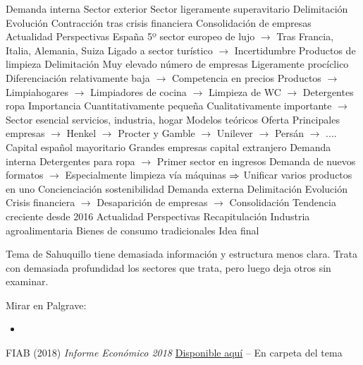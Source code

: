 \documentclass{nuevotema}
\begin{document}
\begin{esquemal}
				\4 Demanda interna
				\4 Sector exterior
				\4[] Sector ligeramente superavitario
				\4 Delimitación
				\4 Evolución
				\4[] Contracción tras crisis financiera
				\4[] Consolidación de empresas
				\4 Actualidad
				\4 Perspectivas
				\4[] España 5º sector europeo de lujo
				\4[] $\to$ Tras Francia, Italia, Alemania, Suiza
				\4[] Ligado a sector turístico
				\4[] $\to$ Incertidumbre
			\3 Productos de limpieza
				\4 Delimitación
				\4[] Muy elevado número de empresas
				\4[] Ligeramente procíclico
				\4[] Diferenciación relativamente baja
				\4[] $\to$ Competencia en precios
				\4[] Productos
				\4[] $\to$ Limpiahogares
				\4[] $\to$ Limpiadores de cocina
				\4[] $\to$ Limpieza de WC
				\4[] $\to$ Detergentes ropa
				\4 Importancia
				\4[] Cuantitativamente pequeña
				\4[] Cualitativamente importante
				\4[] $\to$ Sector esencial servicios, industria, hogar
				\4 Modelos teóricos
				\4 Oferta
				\4[] Principales empresas
				\4[] $\to$ Henkel
				\4[] $\to$ Procter y Gamble
				\4[] $\to$ Unilever
				\4[] $\to$ Persán
				\4[] $\to$ ....
				\4[] Capital español mayoritario
				\4[] Grandes empresas capital extranjero
				\4 Demanda interna
				\4[] Detergentes para ropa
				\4[] $\to$ Primer sector en ingresos
				\4[] Demanda de nuevos formatos
				\4[] $\to$ Especialmente limpieza vía máquinas
				\4[] $\Rightarrow$ Unificar varios productos en uno
				\4[] Concienciación sostenibilidad
				\4 Demanda externa
				\4 Delimitación
				\4 Evolución
				\4[] Crisis financiera
				\4[] $\to$ Desaparición de empresas
				\4[] $\to$ Consolidación
				\4[] Tendencia creciente desde 2016
				\4 Actualidad
				\4 Perspectivas
				\4[]
	\1[] 
		\2 Recapitulación
			\3 Industria agroalimentaria
			\3 Bienes de consumo tradicionales
		\2 Idea final
			
\end{esquemal}


\graficas

\conceptos

\preguntas

\notas

Tema de Sahuquillo tiene demasiada información y estructura menos clara. Trata con demasiada profundidad los sectores que trata, pero luego deja otros sin examinar. 


\bibliografia

Mirar en Palgrave:
\begin{itemize}
	\item 
\end{itemize}


FIAB (2018) \textit{Informe Económico 2018} \href{http://fiab.es/es/archivos/documentos/FIAB_INFORME_ECONOMICO_2018.pdf}{Disponible aquí} -- En carpeta del tema
\end{document}
